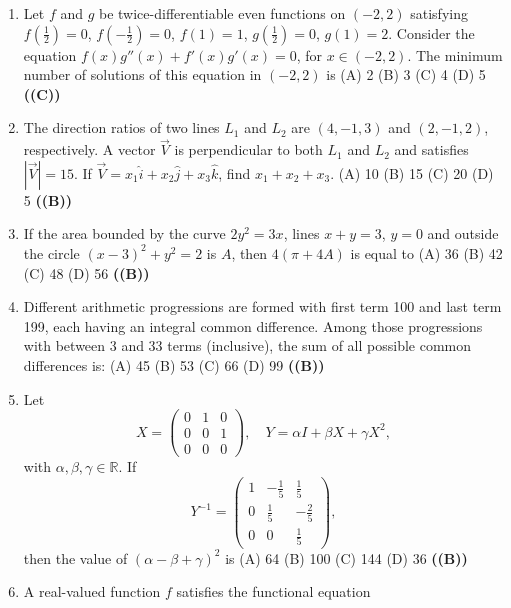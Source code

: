 \documentclass{article}
\begin{document}
\begin{enumerate}
$$ \begin{cases} 4ix + (1+i) y = 0, \\ 8(\cos\frac{2\pi}{3}+i\sin\frac{2\pi}{3}) x + \alpha y = 0. \end{cases} $$
If this system has a nontrivial solution, then $\frac{a}{\beta} =$
(A) $2 - \sqrt{3}$
(B) $-2 + \sqrt{3}$
(C) $2 + \sqrt{3}$
(D) $-2 - \sqrt{3}$ \hfill \textbf{((A))}
\item Let $f$ and $g$ be twice-differentiable even functions on $(-2, 2)$ satisfying
$f(\frac{1}{2}) = 0$, $f(-\frac{1}{2}) = 0$, $f(1) = 1$, $g(\frac{1}{2}) = 0$, $g(1) = 2$.
Consider the equation
$f(x)g''(x) + f'(x) g'(x) = 0$,
for $x \in (-2,2)$. The minimum number of solutions of this equation in $(-2, 2)$ is
(A) 2
(B) 3
(C) 4
(D) 5 \hfill \textbf{((C))}
\item The direction ratios of two lines $L_1$ and $L_2$ are $(4, -1,3)$ and $(2, -1,2)$, respectively. A vector $\vec{V}$ is perpendicular to both $L_1$ and $L_2$ and satisfies $|\vec{V}| = 15$. If
$\vec{V} = x_1 \hat{i} + x_2 \hat{j} + x_3 \hat{k}$,
find $x_1 + x_2 + x_3$.
(A) 10
(B) 15
(C) 20
(D) 5 \hfill \textbf{((B))}
\item If the area bounded by the curve $2y^2 = 3x$, lines $x + y = 3$, $y = 0$ and outside the circle $(x - 3)^2 + y^2 = 2$ is $A$, then $4(\pi+ 4 A)$ is equal to
(A) 36
(B) 42
(C) 48
(D) 56 \hfill \textbf{((B))}
\item Different arithmetic progressions are formed with first term 100 and last term 199, each having an integral common difference. Among those progressions with between 3 and 33 terms (inclusive), the sum of all possible common differences is:
(A) 45
(B) 53
(C) 66
(D) 99 \hfill \textbf{((B))}
\item Let
$$ X=\begin{pmatrix} 0 & 1 & 0 \\ 0 & 0 & 1 \\ 0 & 0 & 0 \end{pmatrix}, \quad Y = \alpha I + \beta X + \gamma X^2, $$
with $\alpha, \beta, \gamma \in \mathbb{R}$. If
$$ Y^{-1} = \begin{pmatrix} 1 & -\frac{1}{5} & \frac{1}{5} \\ 0 & \frac{1}{5} & -\frac{2}{5} \\ 0 & 0 & \frac{1}{5} \end{pmatrix}, $$
then the value of $(\alpha - \beta + \gamma)^2$ is
(A) 64
(B) 100
(C) 144
(D) 36 \hfill \textbf{((B))}
\item A real-valued function $f$ satisfies the functional equation

\end{enumerate}
\end{document}
